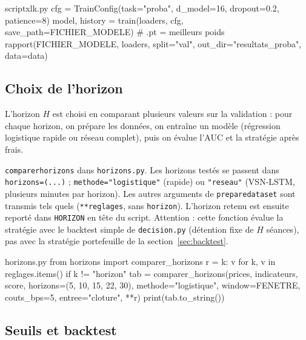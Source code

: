 \documentclass[11pt,a4paper]{article}
\renewcommand{\_}{\usorig\allowbreak}   %
\newcommand{\f}[1]{\texttt{#1}}        %
\begin{document}
\begin{code}[entraînement]{script\_xlk.py}
cfg = TrainConfig(task="proba", d_model=16, dropout=0.2, patience=8)
model, history = train(loaders, cfg, save_path=FICHIER_MODELE)   # .pt = meilleurs poids
rapport(FICHIER_MODELE, loaders, split="val", out_dir="resultats_proba", data=data)
\end{code}

\subsection{Choix de l'horizon}\label{sec:horizons}
L'horizon $H$ est choisi en comparant plusieurs valeurs sur la validation : pour chaque
horizon, on prépare les données, on entraîne un modèle (régression logistique rapide ou
réseau complet), puis on évalue l'AUC et la stratégie après frais.

\begin{danslecode}
\f{comparer\_horizons} dans \f{horizons.py}. Les horizons testés se passent dans
\f{horizons=(...)} ; \f{methode="logistique"} (rapide) ou \f{"reseau"} (VSN-LSTM, plusieurs
minutes par horizon). Les autres arguments de \f{prepare\_dataset} sont transmis tels quels
(\f{**reglages}, sans \f{horizon}). L'horizon retenu est ensuite reporté dans
\f{HORIZON} en tête du script. Attention : cette fonction évalue la stratégie avec le
backtest simple de \f{decision.py} (détention fixe de $H$ séances), pas avec la stratégie
portefeuille de la section~\ref{sec:backtest}.
\end{danslecode}

\begin{code}{horizons.py}
from horizons import comparer_horizons
r = {k: v for k, v in reglages.items() if k != "horizon"}
tab = comparer_horizons(prices, indicateurs, score, horizons=(5, 10, 15, 22, 30),
                        methode="logistique", window=FENETRE, couts_bps=5,
                        entree="cloture", **r)
print(tab.to_string())
\end{code}

\subsection{Seuils et backtest}
\end{document}
